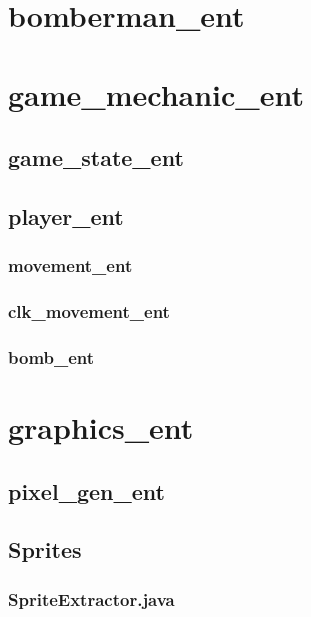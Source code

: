 \documentclass[parskip=full]{scrartcl}
\begin{document}
		\section{bomberman\_ent}
		
		\section{game\_mechanic\_ent}

			\subsection{game\_state\_ent}

			\subsection{player\_ent}

				\subsubsection{movement\_ent}
				\subsubsection{clk\_movement\_ent}
					
				\subsubsection{bomb\_ent}

		\section{graphics\_ent}

			\subsection{pixel\_gen\_ent}
	
			\subsection{Sprites}

				\subsubsection{SpriteExtractor.java}
\end{document}
